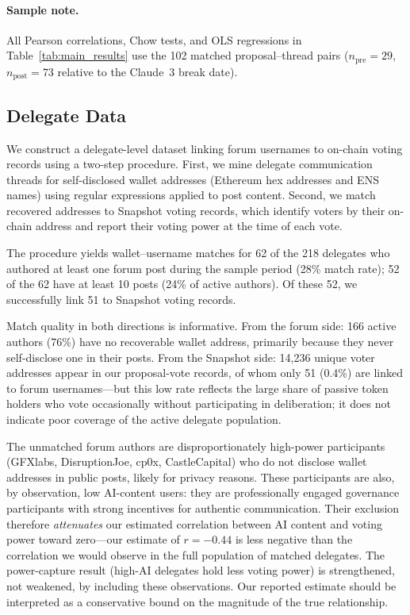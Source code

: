 \documentclass[12pt]{article}
\begin{document}
\paragraph{Sample note.}
All Pearson correlations, Chow tests, and OLS regressions in
Table~\ref{tab:main_results} use the 102 matched proposal--thread pairs
($n_{\text{pre}} = 29$, $n_{\text{post}} = 73$
relative to the Claude~3 break date).\label{sec:matching}

\subsection{Delegate Data}

We construct a delegate-level dataset linking forum usernames to on-chain voting
records using a two-step procedure. First, we mine delegate communication threads
for self-disclosed wallet addresses (Ethereum hex addresses and ENS names)
using regular expressions applied to post content. Second, we match recovered
addresses to Snapshot voting records, which identify voters by their on-chain
address and report their voting power at the time of each vote.

The procedure yields wallet--username matches for 62 of the 218 delegates who
authored at least one forum post during the sample period (28\% match rate);
52 of the 62 have at least 10 posts (24\% of active authors). Of these 52,
we successfully link 51 to Snapshot voting records.

Match quality in both directions is informative. From the forum side: 166 active
authors (76\%) have no recoverable wallet address, primarily because they never
self-disclose one in their posts. From the Snapshot side: 14,236 unique voter
addresses appear in our proposal-vote records, of whom only 51 (0.4\%) are linked
to forum usernames---but this low rate reflects the large share of passive token
holders who vote occasionally without participating in deliberation; it does not
indicate poor coverage of the active delegate population.

The unmatched forum authors are disproportionately high-power participants
(GFXlabs, DisruptionJoe, cp0x, CastleCapital) who do not disclose wallet addresses
in public posts, likely for privacy reasons. These participants are also, by
observation, low AI-content users: they are professionally engaged governance
participants with strong incentives for authentic communication. Their exclusion
therefore \emph{attenuates} our estimated correlation between AI content and
voting power toward zero---our estimate of $r = -0.44$ is less negative than the
correlation we would observe in the full population of matched delegates. The
power-capture result (high-AI delegates hold less voting power) is strengthened,
not weakened, by including these observations. Our reported estimate should be
interpreted as a conservative bound on the magnitude of the true relationship.
\end{document}
